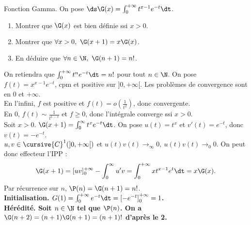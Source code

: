 \documentclass[11pt]{article}
\begin{document}
\begin{exi}{Fonction Gamma.}{}
    On pose $\ds\G(x)=\int_0^{+\infty}t^{x-1}e^{-t}\dt$.
    \begin{enumerate}
        \item Montrer que $\G(x)$ est bien définie ssi $x>0$.
        \item Montrer que $\forall x > 0, ~ \G(x+1)=x\G(x)$.
        \item En déduire que $\forall n \in \N, ~ \G(n+1)=n!$.
    \end{enumerate}
    On retiendra que $\int_0^{+\infty}t^ne^{-t}\dt=n!$ pour tout $n\in\N$.
    \tcblower
     On pose $f(t)=x^{x-1}e^{-t}$, cpm et positive sur $]0,+\infty[$. Les problèmes de convergence sont en 0 et $+\infty$.\\
    En l'infini, $f$ est positive et $f(t)=o(\frac{1}{t^2})$, donc convergente.\\
    En 0, $f(t)\sim\frac{1}{t^{1-x}}$ et $f\geq0$, donc l'intégrale converge ssi $x>0$.\\
     Soit $x>0$. $\G(x+1)=\int_0^\infty t^x e^{-t}\dt$. On pose $u(t)=t^x$ et $v'(t)=e^{-t}$, donc $v(t)=-e^{-t}$.\\
    $u,v\in\cursive{C}^1(]0,+\infty[)$ et $u(t)v(t)\to_{\infty}0, ~ u(t)v(t)\to_{0}0$. On peut donc effecteur l'IPP :
    \begin{equation*}
        \G(x+1)=[uv]_0^{+\infty}-\int_0^{\infty}u'v = \int_0^{+\infty}xt^{x-1}e^t\dt = x\G(x).
    \end{equation*}
     Par récurrence sur $n$, $\P(n)=\G(n+1)=n!$.\\
    \bf{Initialisation.} $G(1)=\int_0^{+\infty}e^{-t}\dt=\left[ -e^{-t} \right]_0^{+\infty}=1$.\\
    \bf{Hérédité.} Soit $n\in\N$ tel que $\P(n)$. On a $\G(n+2)=(n+1)\G(n+1)=(n+1)!$ d'après le 2.
\end{exi}

\vspace*{-0.7cm}
\end{document}
